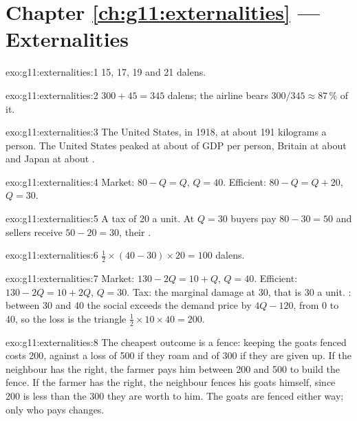 \section*{Chapter \ref{ch:g11:externalities} --- Externalities}

\begin{solution}{exo:g11:externalities:1}
15, 17, 19 and 21 dalens.
\end{solution}

\begin{solution}{exo:g11:externalities:2}
$300 + 45 = 345$ dalens; the airline bears $300/345 \approx 87\,\%$ of it.
\end{solution}

\begin{solution}{exo:g11:externalities:3}
The United States, in 1918, at about 191 kilograms a person. The United States peaked at about  of GDP per person, Britain at about  and Japan at about
.
\end{solution}

\begin{solution}{exo:g11:externalities:4}
Market: $80 - Q = Q$, $Q = 40$. Efficient: $80 - Q = Q + 20$, $Q = 30$.
\end{solution}

\begin{solution}{exo:g11:externalities:5}
A tax of 20 a unit. At $Q = 30$ buyers pay $80 - 30 = 50$ and sellers receive $50 - 20 = 30$, their .
\end{solution}

\begin{solution}{exo:g11:externalities:6}
$\tfrac12 \times (40 - 30) \times 20 = 100$ dalens.
\end{solution}

\begin{solution}{exo:g11:externalities:7}
Market: $130 - 2Q = 10 + Q$, $Q = 40$. Efficient: $130 - 2Q = 10 + 2Q$, $Q = 30$. Tax: the marginal damage at 30, that is 30 a unit. : between 30 and 40
the social  exceeds the demand price by $4Q - 120$, from 0 to 40, so the loss is the triangle $\tfrac12 \times 10 \times 40 = 200$.
\end{solution}

\begin{solution}{exo:g11:externalities:8}
The cheapest outcome is a fence: keeping the goats fenced costs 200, against a loss of 500 if they roam and of 300 if they are given up. If the neighbour has the right,
the farmer pays him between 200 and 500 to build the fence. If the farmer has the right, the neighbour fences his goats himself, since 200 is less than the 300 they are
worth to him. The goats are fenced either way; only who pays changes.
\end{solution}

